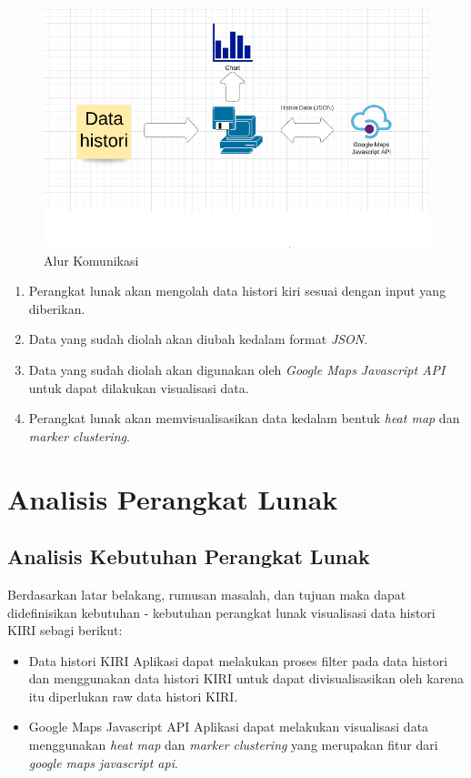 \begin{figure}[H]
	\centering  
	\includegraphics[scale=0.55]{Gambar/software-flow.PNG}  
	\caption[Alur Komunikasi]{Alur Komunikasi} 
	\label{fig:alurKomunikasi} 
\end{figure} 

\begin{enumerate}
\item Perangkat lunak akan mengolah data histori kiri sesuai dengan input yang diberikan.
\item Data yang sudah diolah  akan diubah kedalam format \textit{JSON}.
\item Data yang sudah diolah akan digunakan oleh \textit{Google Maps Javascript API} untuk dapat dilakukan visualisasi data.
\item Perangkat lunak akan memvisualisasikan data kedalam bentuk \textit{heat map} dan \textit{marker clustering}.

\end{enumerate}


\section{Analisis Perangkat Lunak}
\subsection{Analisis Kebutuhan Perangkat Lunak}
Berdasarkan latar belakang, rumusan masalah, dan tujuan maka dapat didefinisikan kebutuhan - kebutuhan perangkat lunak visualisasi data histori KIRI sebagi berikut:
\begin{itemize}
    \item Data histori KIRI
    Aplikasi dapat melakukan proses filter pada data histori dan menggunakan data histori KIRI untuk dapat divisualisasikan oleh karena itu diperlukan raw data histori KIRI.
    
    \item Google Maps Javascript API
    Aplikasi dapat melakukan visualisasi data menggunakan \textit{heat map} dan \textit{marker clustering} yang merupakan fitur dari \textit{google maps javascript api}.
    
\end{itemize}

